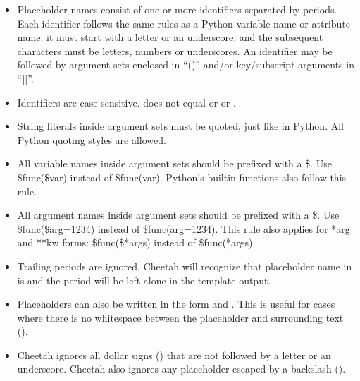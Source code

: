 \begin{itemize} 
     
\item Placeholder names consist of one or more identifiers separated by periods.
     Each identifier follows the same rules as a Python variable name or
     attribute name: it must start with a letter or an underscore, and the
     subsequent characters must be letters, numbers or underscores.  An
     identifier may be followed by argument sets enclosed in ``()'' and/or
     key/subscript arguments in ``[]''.

\item Identifiers are case-sensitive.  does not equal 
     or  or .     
     
\item String literals inside argument sets must be quoted, just like in Python.
     All Python quoting styles are allowed.
     
\item All variable names inside argument sets should be prefixed with a \$.
     Use \$func(\$var) instead of \$func(var).  Python's builtin functions also
     follow this rule.

\item All argument names inside argument sets should be prefixed with a \$.
     Use \$func(\$arg=1234) instead of \$func(arg=1234).  This rule also applies
     for *arg and **kw forms: \$func(\$*args) instead of \$func(*args).
    
\item Trailing periods are ignored.  Cheetah will recognize that placeholder
     name in  is  and the period will be left
     alone in the template output.
     
\item Placeholders can also be written in the form 
     and .  This is useful for cases where there is no
     whitespace between the placeholder and surrounding text
     ().
   
\item Cheetah ignores all dollar signs (\code{\$}) that are not followed by a
     letter or an underscore.  Cheetah also ignores any placeholder escaped by a
     backslash ().

\end{itemize} 

